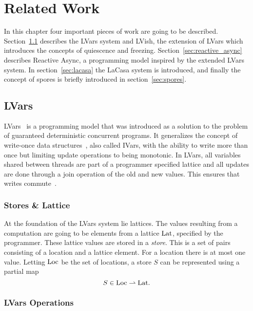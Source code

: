 \chapter{Related Work}\label{cha:related_work}

In this chapter four important pieces of work are going to be described.
Section~\ref{sec:lvars} describes the LVars system and LVish, the extension
of LVars which introduces the concepts of quiescence and freezing. 
Section~\ref{sec:reactive_async} describes Reactive Async, a programming model
inspired by the extended LVars system. In section~\ref{sec:lacasa} the LaCasa
system is introduced, and finally the concept of spores is briefly introduced in
section~\ref{sec:spores}.

\section{LVars}\label{sec:lvars}

LVars~\parencite{kuper2013lvars} is a programming model that was introduced as a
solution to the problem of guaranteed deterministic concurrent programs. It
generalizes the concept of write-once data
structures~\parencite{nikhil1989structures}, also called IVars, with the ability
to write more than once but limiting update operations to being monotonic.
In LVars, all variables shared between threads are part of a programmer
specified lattice and all updates are done through a join operation of the old
and new values. This ensures that writes commute~\parencite{kuper2013lvars}.

\subsection{Stores \& Lattice}%
\label{sub:stores_and_lattice}

At the foundation of the LVars system lie lattices. The values resulting from a
computation are going to be elements from a lattice $\mathrm{Lat}$, specified by the
programmer. These lattice values are stored in a \emph{store}.  This is a set of
pairs consisting of a location and a lattice element. For a location there is
at most one value. Letting $\mathrm{Loc}$ be the set of locations, a store $S$ can
be represented using a partial map
\begin{equation*}
  S \in \mathrm{Loc} \rightharpoonup \mathrm{Lat}.
\end{equation*}

\subsection{LVars Operations}%
\label{sub:lvars_operations}

